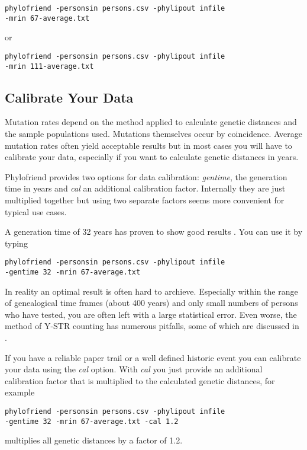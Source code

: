 \noindent\texttt{phylofriend -personsin persons.csv -phylipout infile\\
-mrin 67-average.txt}

\noindent or

\noindent\texttt{phylofriend -personsin persons.csv -phylipout infile\\
-mrin 111-average.txt}


\subsection{Calibrate Your Data}

Mutation rates depend on the method applied to calculate
genetic distances and the sample populations used. Mutations
themselves occur by coincidence. Average mutation rates
often yield acceptable results but in most cases you will
have to calibrate your data, especially if you want to
calculate genetic distances in years.

Phylofriend provides two options for data calibration:
\emph{gentime}, the generation time in years and
\emph{cal} an additional calibration factor. Internally
they are just multiplied together but using two separate
factors seems more convenient for typical use cases.

A generation time of 32 years has proven to show good
results \cite{YFullMutationRate}. You can use it by typing

\noindent\texttt{phylofriend -personsin persons.csv -phylipout infile\\
-gentime 32 -mrin 67-average.txt}

In reality an optimal result is often hard to archieve.
Especially within the range of genealogical time frames
(about 400 years) and only small numbers of persons who
have tested, you are often left with a large statistical error.
Even worse, the method of Y-STR counting has numerous
pitfalls, some of which are discussed in \cite{Ham15}.

If you have a reliable paper trail or a well defined
historic event you can calibrate your data using the
\emph{cal} option. With \emph{cal} you just provide an
additional calibration factor that is multiplied to
the calculated genetic distances, for example

\noindent\texttt{phylofriend -personsin persons.csv -phylipout infile\\
-gentime 32 -mrin 67-average.txt -cal 1.2}

multiplies all genetic distances by a factor of 1.2.



